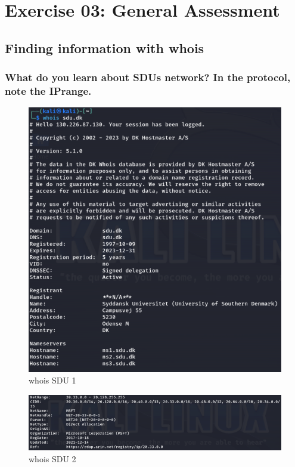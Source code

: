 \section{Exercise 03: General Assessment}
\subsection{Finding information with whois}


\subsubsection{What do you learn about SDUs network? In the protocol, note the IPrange.}

\begin{figure}[H]
    \centering
    \includegraphics[width=0.8\linewidth]{pic/whois SDU 1.png}
    \caption{whois SDU 1}
    \label{fig:whois SDU 1}
\end{figure}

\begin{figure}[H]
    \centering
    \includegraphics[width=0.8\linewidth]{pic/whois SDU 2.png}
    \caption{whois SDU 2}
    \label{fig:whois SDU 2}
\end{figure}

